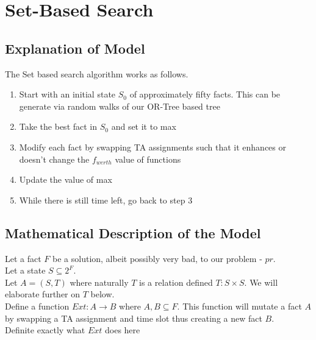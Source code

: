 \documentclass{article}
\begin{document}
\section{Set-Based Search}

\subsection{Explanation of Model}

The Set based search algorithm works as follows.

\begin{enumerate}

\item Start with an initial state $S_0$ of approximately fifty facts.
  This can be generate via random walks of our OR-Tree based tree

\item Take the best fact in $S_0$ and set it to max

\item Modify each fact by swapping TA assignments such that it
  enhances or doesn't change the $f_{werth}$ value of functions

\item Update the value of max

\item While there is still time left, go back to step 3


\end{enumerate}

\subsection{Mathematical Description of the Model}


Let a fact $F$ be a solution, albeit possibly very bad, to our problem
- $pr$.\\

Let a state $S \subseteq 2^F$.\\

Let $A = (S, T)$ where naturally $T$ is a relation defined $T: S
\times S$. We will elaborate further on $T$ below.\\

Define a function $Ext: A \rightarrow B$ where $A,B \subseteq F$. This
function will mutate a fact $A$ by swapping a TA assignment and time
slot thus creating a new fact $B$.\\

Definite exactly what $Ext$ does here\\
\end{document}
